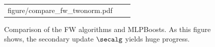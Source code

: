 \begin{figure}[p]
\begin{tabular}{ccc}
\begin{minipage}[t]{0.31\hsize}
            {figure/compare_fw_twonorm.pdf}
        \end{minipage}
    \end{tabular}
    \caption{%
        Comparison of the FW algorithms and MLPBoosts. %
        As this figure shows, the secondary update $\secalg$ yields %
        huge progress. %
    }
    \label{fig:appendix_mlpb_compare}
\end{figure}
